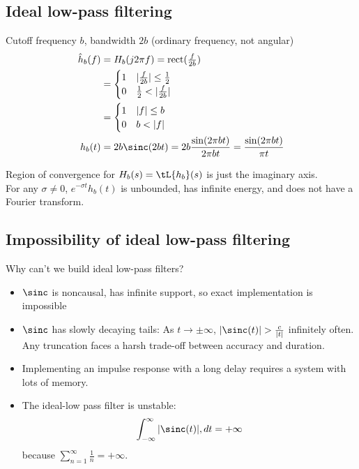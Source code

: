 \documentclass{ximera}
\begin{document}
\subsection{Ideal low-pass filtering}
  Cutoff frequency $b$, bandwidth $2b$ (ordinary frequency, not angular)
    \begin{align*}
      \hat{h}_b(f)
      &= H_b(j2\pi f) = \operatorname{rect}(\tfrac{f}{2b})\\
      &= \begin{cases}
      1 & |\tfrac{f}{2b}| \leq \tfrac{1}{2}\\
      0 & \tfrac{1}{2} < |\tfrac{f}{2b}|
    \end{cases}\\
      &= \begin{cases}
      1 & |f| \leq b\\
      0 & b < |f|
    \end{cases}\\
      h_b(t)
      &= 2 b \sinc(2 b t) = 2 b\frac{\sin(2 \pi b t)}{2 \pi b t} = \frac{\sin(2 \pi b t)}{\pi t}
    \end{align*}

    Region of convergence for $H_b(s) = \tL{h_b}(s)$ is just the imaginary axis.\\
    For any $\sigma \neq 0$, $e^{-\sigma t} h_b(t)$ is unbounded, has infinite energy, and does not have a Fourier transform.
  


\subsection{Impossibility of ideal low-pass filtering}
  Why can't we build ideal low-pass filters?
  \begin{itemize}
  \item $\sinc$ is noncausal, has infinite support, so exact implementation is impossible
  \item $\sinc$ has slowly decaying tails: As $t \to \pm \infty$, $|\sinc(t)| > \frac{c}{|t|}$ infinitely often.\\
    Any truncation faces a harsh trade-off between accuracy and duration.\\
  \item Implementing an impulse response with a long delay requires a system with lots of memory.
  \item The ideal-low pass filter is unstable:
    \[
      \int_{-\infty}^{\infty} |\sinc(t)|,dt = +\infty
    \]
    because $\sum_{n=1}^{\infty} \frac{1}{n} = +\infty$.

  \end{itemize}
 
\end{document}
